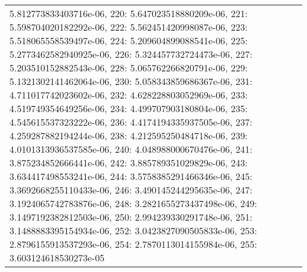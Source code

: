 \begin{tabular}{lrl}
5.812773833403716e-06, 220: 5.647023518880209e-06, 221: 5.598704020182292e-06, 222: 5.562451420998087e-06, 223: 5.518065558539497e-06, 224: 5.209604899088541e-06, 225: 5.2773462582940925e-06, 226: 5.324457732724473e-06, 227: 5.203510152882543e-06, 228: 5.065762266820791e-06, 229: 5.1321302141462064e-06, 230: 5.058343859686367e-06, 231: 4.711017742023602e-06, 232: 4.628228803052969e-06, 233: 4.519749354649256e-06, 234: 4.499707903180804e-06, 235: 4.545615537323222e-06, 236: 4.4174194335937505e-06, 237: 4.259287882194244e-06, 238: 4.212595250484718e-06, 239: 4.0101313936537585e-06, 240: 4.048988000670476e-06, 241: 3.875234852666441e-06, 242: 3.885789351029829e-06, 243: 3.634417498553241e-06, 244: 3.5758385291466346e-06, 245: 3.3692668255110433e-06, 246: 3.490145244295635e-06, 247: 3.1924065742783876e-06, 248: 3.2821655273437498e-06, 249: 3.1497192382812503e-06, 250: 2.994239330291748e-06, 251: 3.1488883395154934e-06, 252: 3.0423827090505833e-06, 253: 2.8796155913537293e-06, 254: 2.7870113014155984e-06, 255: 3.603124618530273e-05} \\

\end{tabular}
